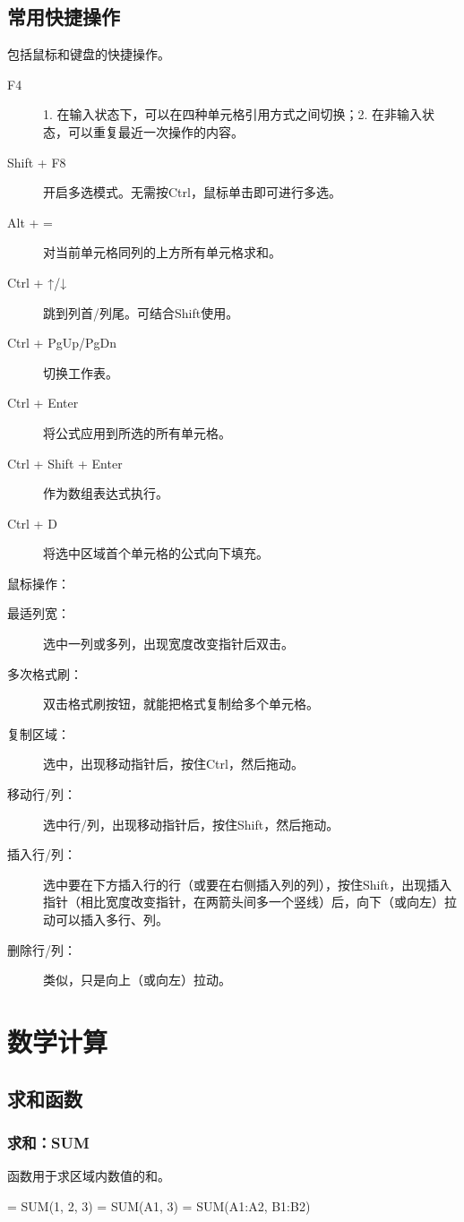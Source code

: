 \section{常用快捷操作}
包括鼠标和键盘的快捷操作。
\begin{description}
\item[F4] 1. 在输入状态下，可以在四种单元格引用方式之间切换；2. 在非输入状态，可以重复最近一次操作的内容。
\item[Shift + F8] 开启多选模式。无需按Ctrl，鼠标单击即可进行多选。
\item[Alt + =] 对当前单元格同列的上方所有单元格求和。
\item[Ctrl + ↑/↓] 跳到列首/列尾。可结合Shift使用。
\item[Ctrl + PgUp/PgDn] 切换工作表。
\item[Ctrl + Enter] 将公式应用到所选的所有单元格。
\item[Ctrl + Shift + Enter] 作为数组表达式执行。
\item[Ctrl + D] 将选中区域首个单元格的公式向下填充。
\end{description}

\vspace*{2ex}鼠标操作：
\begin{description}
\item[最适列宽：] 选中一列或多列，出现宽度改变指针后双击。
\item[多次格式刷：] 双击格式刷按钮，就能把格式复制给多个单元格。
\item[复制区域：] 选中，出现移动指针后，按住Ctrl，然后拖动。
\item[移动行/列：] 选中行/列，出现移动指针后，按住Shift，然后拖动。
\item[插入行/列：] 选中要在下方插入行的行（或要在右侧插入列的列），按住Shift，出现插入指针（相比宽度改变指针，在两箭头间多一个竖线）后，向下（或向左）拉动可以插入多行、列。
\item[删除行/列：] 类似，只是向上（或向左）拉动。
\end{description}

\chapter{数学计算}
\section{求和函数}
\subsection{求和：SUM}
函数用于求区域内数值的和。
\begin{excode}
= SUM(1, 2, 3)   
= SUM(A1, 3)
= SUM(A1:A2, B1:B2)
\end{excode}

